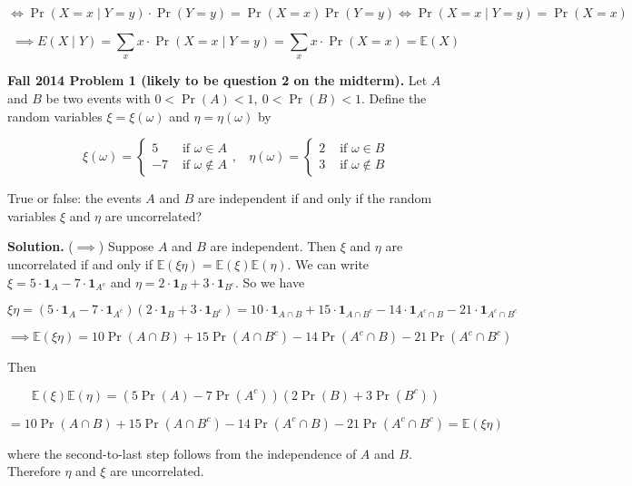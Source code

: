 \documentclass{article}
\newcommand{\E}{\mathbb{E}}
\begin{document}
\[
\iff \Pr(X = x \mid Y = y) \cdot \Pr(Y = y) =  \Pr(X = x) \Pr(Y = y) \iff \Pr(X = x \mid Y = y) = \Pr(X = x)
\]

\[
\implies E(X \mid Y) = \sum_x x \cdot \Pr(X = x \mid Y = y ) = \sum_x x \cdot \Pr(X = x ) = \E(X)
\]


\textbf{Fall 2014 Problem 1 (likely to be question 2 on the midterm).} Let \(A\) and \(B\) be two events with \(0 < \Pr(A) < 1, \ 0 < \Pr(B) < 1\). Define the random variables \(\xi = \xi(\omega)\) and \(\eta = \eta(\omega)\) by

\[
\xi(\omega) = \begin{cases} 
      5 & \text{ if } \omega \in A \\
      -7 &  \text{ if } \omega \notin A 
   \end{cases}, \ \ \ \ \eta(\omega) = \begin{cases} 
      2 & \text{ if } \omega \in B \\
      3 &  \text{ if } \omega \notin B 
   \end{cases}
\]

True or false: the events \(A\) and \(B\) are independent if and only if the random variables \(\xi\) and \(\eta\) are uncorrelated?

\textbf{Solution.} (\(\implies\)) Suppose \(A\) and \(B\) are independent. Then \(\xi\) and \(\eta\) are uncorrelated if and only if \(\E(\xi \eta ) = \E(\xi) \E(\eta)\). We can write \(\xi = 5 \cdot \boldsymbol{1}_A - 7 \cdot \boldsymbol{1}_{A^c}\) and \(\eta = 2 \cdot \boldsymbol{1}_B + 3 \cdot \boldsymbol{1}_{B^c}\). So we have

\[
\xi \eta = (5 \cdot \boldsymbol{1}_A - 7 \cdot \boldsymbol{1}_{A^c})(2 \cdot \boldsymbol{1}_B + 3 \cdot \boldsymbol{1}_{B^c}) = 10 \cdot \boldsymbol{1}_{A \cap B} +15 \cdot \boldsymbol{1}_{A \cap B^c} - 14 \cdot \boldsymbol{1}_{A^c \cap B} - 21 \cdot \boldsymbol{1}_{A^c \cap B^c}
\]

\[
\implies \E(\xi \eta ) = 10 \Pr(A \cap B) +15\Pr(A \cap B^c) - 14 \Pr(A^c \cap B) - 21\Pr(A^c \cap B^c)
\]

Then

\[
\E(\xi) \E(\eta) = (5 \Pr(A) - 7 \Pr(A^c))(2 \Pr(B) + 3 \Pr(B^c)) 
\]

\[
= 10\Pr(A \cap B) + 15 \Pr(A \cap B^c) - 14 \Pr(A^c \cap B) - 21 \Pr(A^c \cap B^c) = \E(\xi \eta )
\]

where the second-to-last step follows from the independence of \(A\) and \(B\). Therefore \(\eta\) and \(\xi\) are uncorrelated.
\end{document}
